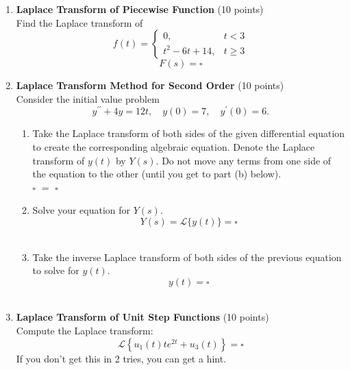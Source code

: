 \begin{enumerate}
  \newpage

  \item \textbf{Laplace Transform of Piecewise Function} (10 points)\\
  Find the Laplace transform of
  $$
  f(t)= \begin{cases}0, & t<3 \\ t^2-6 t+14, & t \geq 3\end{cases}
  $$
  $$
  F(s)=\square
  $$
  \begin{subanswer}
  \end{subanswer}

  \item \textbf{Laplace Transform Method for Second Order} (10 points)\\
  Consider the initial value problem
  $$
  y^{\prime \prime}+4 y=12 t, \quad y(0)=7, \quad y^{\prime}(0)=6 .
  $$
  \begin{enumerate}[label=\alph*]
    \item Take the Laplace transform of both sides of the given differential 
    equation to create the corresponding algebraic equation. Denote the 
    Laplace transform of $y(t)$ by $Y(s)$. Do not move any terms from 
    one side of the equation to the other (until you get to part (b) below).\\
    $\square$ $=$ $\square$\\
    \begin{subanswer}
    \end{subanswer}
    \item Solve your equation for $Y(s)$.\\
    $$
    Y(s)=\mathcal{L}\{y(t)\}=\square
    $$\\
    \begin{subanswer}
    \end{subanswer}
    \item Take the inverse Laplace transform of both sides of the previous equation to solve for $y(t)$.\\
    $$
    y(t)=\square
    $$\\
    \begin{subanswer}
    \end{subanswer}
  \end{enumerate}

  \item \textbf{Laplace Transform of Unit Step Functions} (10 points)\\
  Compute the Laplace transform:
  $$
  \mathcal{L}\left\{u_1(t) t e^{2 t}+u_3(t)\right\}=\square
  $$
  If you don't get this in 2 tries, you can get a hint.\\
  \begin{subanswer}
  \end{subanswer}


\end{enumerate}
